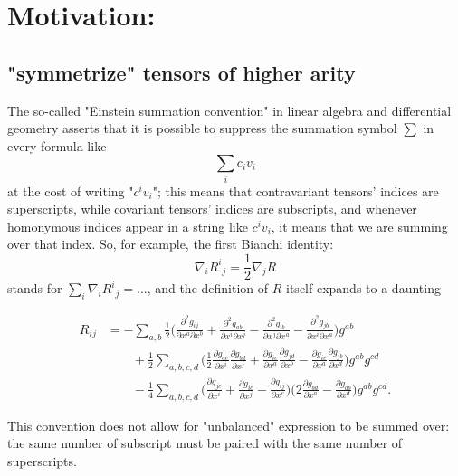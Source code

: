 \documentclass[11pt]{amsart}
\begin{document}
\maketitle
\tableofcontents
\section{Motivation:}
\label{sec:org59907ba}
\subsection{"symmetrize" tensors of higher arity}
\label{sec:orgb9ea8dc}

The so-called "Einstein summation convention" in linear algebra and differential geometry 
asserts that it is possible to suppress the summation symbol \(\sum\) in every formula like 
\[
 \textstyle \sum_i c_i v_i
\] at the cost of writing "\(c^iv_i\)"; this means that contravariant tensors' indices are superscripts,
while covariant tensors' indices are subscripts, and whenever homonymous indices appear in a string 
like \(c^iv_i\), it means that we are summing over that index. So, for example, the first
Bianchi identity:
\[
\nabla_i {R^i}_j = \frac{1}{2}\nabla_j R
\] stands for \(\sum_i \nabla_i {R^i}_j = \dots\), and the definition of \(R\) itself expands to a daunting

\begin{align*}
R_{ij}&=-\sum_{a,b}\frac{1}{2}\Big(\frac{\partial^2g_{ij}}{\partial x^a\partial x^b}+\frac{\partial^2g_{ab}}{\partial x^i\partial x^j}-\frac{\partial^2g_{ib}}{\partial x^j\partial x^a}-\frac{\partial^2g_{jb}}{\partial x^i\partial x^a}\Big)g^{ab}\\
&\qquad+\frac{1}{2}\sum_{a,b,c,d}\Big(\frac{1}{2}\frac{\partial g_{ac}}{\partial x^i}\frac{\partial g_{bd}}{\partial x^j}+\frac{\partial g_{ic}}{\partial x^a}\frac{\partial g_{jd}}{\partial x^b}-\frac{\partial g_{ic}}{\partial x^a}\frac{\partial g_{jb}}{\partial x^d}\Big)g^{ab}g^{cd}\\
&\qquad-\frac{1}{4}\sum_{a,b,c,d}\Big(\frac{\partial g_{jc}}{\partial x^i}+\frac{\partial g_{ic}}{\partial x^j}-\frac{\partial g_{ij}}{\partial x^c}\Big)\Big(2\frac{\partial g_{bd}}{\partial x^a}-\frac{\partial g_{ab}}{\partial x^d}\Big)g^{ab}g^{cd}.
\end{align*}  

This convention does not allow for "unbalanced" expression to be summed over: the
same number of subscript must be paired with the same number of superscripts.
\end{document}
